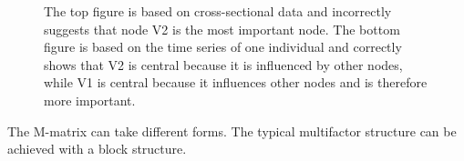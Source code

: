 \documentclass[
  a4paper,
  DIV=11,
  numbers=noendperiod,
  oneside]{scrreprt}
\begin{document}
\begin{figure}


\caption{\label{fig-ch6-img16-old-85}The top figure is based on
cross-sectional data and incorrectly suggests that node V2 is the most
important node. The bottom figure is based on the time series of one
individual and correctly shows that V2 is central because it is
influenced by other nodes, while V1 is central because it influences
other nodes and is therefore more important.}

\end{figure}%

The M-matrix can take different forms. The typical multifactor structure
can be achieved with a block structure.
\end{document}
